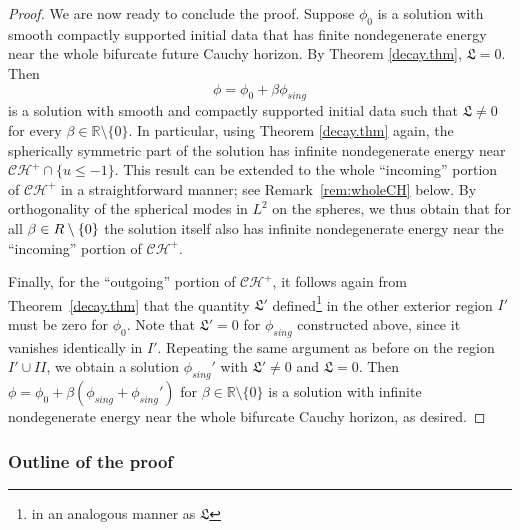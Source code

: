 \documentclass[12 pt, reqno]{amsart}
\theoremstyle{definition}
\theoremstyle{remark}
\numberwithin{equation}{section}
\newcommand{\set}[1]{\{#1\}}
\newcommand{\0}{\emptyset}
\newcommand{\bt}{\beta}
\newcommand{\bbR}{\mathbb R}
\newcommand{\calC}{\mathcal C}
\newcommand{\calH}{\mathcal H}
\newcommand{\CH}{\calC \calH^{+}}		%
\begin{document}
\begin{proof}
We are now ready to conclude the proof. Suppose $\phi_0$ is a solution with smooth compactly supported initial data that has finite nondegenerate energy near the whole bifurcate future Cauchy horizon. By Theorem \ref{decay.thm}, $\mathfrak L=0$. 
Then  
$$\phi=\phi_0+\beta\phi_{sing}$$
is a solution with smooth and compactly supported initial data such that $\mathfrak L\neq 0$ for every $\beta\in\mathbb R\setminus \{0\}$. In particular, using Theorem \ref{decay.thm} again, the spherically symmetric part of the solution has infinite nondegenerate energy near $\CH \cap \set{u \leq -1}$. This result can be extended to the whole ``incoming'' portion of $\CH$ in a straightforward manner; see Remark~\ref{rem:wholeCH} below. By orthogonality of the spherical modes in $L^2$ on the spheres, we thus obtain that for all $\beta\in \mathbb \bbR \setminus  \{0\}$ the solution itself also has infinite nondegenerate energy near the ``incoming'' portion of $\CH$. 

Finally, for the ``outgoing'' portion of $\CH$, it follows again from Theorem~\ref{decay.thm} that the quantity $\mathfrak L'$ defined\footnote{in an analogous manner as $\mathfrak L$} in the other exterior region $I'$ must be zero for $\phi_{0}$. Note that $\mathfrak L' = 0$ for $\phi_{sing}$ constructed above, since it vanishes identically in $I'$. Repeating the same argument as before on the region $I' \cup II$, we obtain a solution $\phi_{sing}'$ with $\mathfrak L' \neq 0$ and $\mathfrak{L} = 0$. Then $\phi = \phi_{0} + \bt (\phi_{sing} + \phi_{sing}')$ for $\bt \in \bbR \setminus \set{0}$ is a solution with infinite nondegenerate energy near the whole bifurcate Cauchy horizon, as desired.
\end{proof}

\subsubsection{Outline of the proof}\label{sec.outline}
\end{document}
